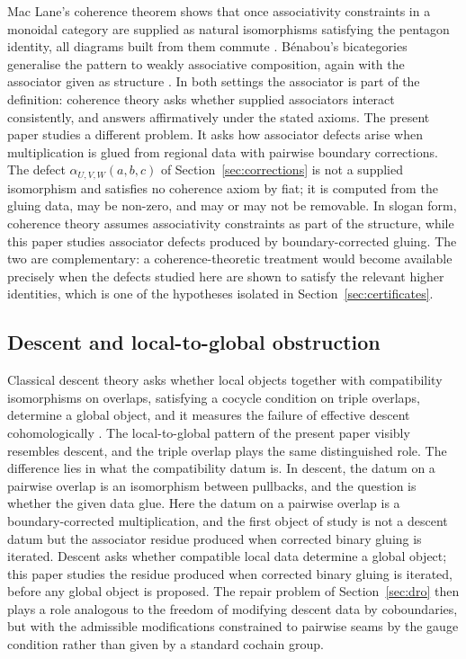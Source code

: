 \documentclass[11pt]{article}
\begin{document}
Mac Lane's coherence theorem shows that once associativity constraints in a monoidal category are supplied as natural isomorphisms satisfying the pentagon identity, all diagrams built from them commute \cite{MacLane1963,MacLane1998}. B\'enabou's bicategories generalise the pattern to weakly associative composition, again with the associator given as structure \cite{Benabou1967}. In both settings the associator is part of the definition: coherence theory asks whether supplied associators interact consistently, and answers affirmatively under the stated axioms. The present paper studies a different problem. It asks how associator defects arise when multiplication is glued from regional data with pairwise boundary corrections. The defect \(\alpha_{U,V,W}(a,b,c)\) of Section~\ref{sec:corrections} is not a supplied isomorphism and satisfies no coherence axiom by fiat; it is computed from the gluing data, may be non-zero, and may or may not be removable. In slogan form, coherence theory assumes associativity constraints as part of the structure, while this paper studies associator defects produced by boundary-corrected gluing. The two are complementary: a coherence-theoretic treatment would become available precisely when the defects studied here are shown to satisfy the relevant higher identities, which is one of the hypotheses isolated in Section~\ref{sec:certificates}.

\subsection{Descent and local-to-global obstruction}

Classical descent theory asks whether local objects together with compatibility isomorphisms on overlaps, satisfying a cocycle condition on triple overlaps, determine a global object, and it measures the failure of effective descent cohomologically \cite{Giraud1971,Vistoli2005,Weibel1994}. The local-to-global pattern of the present paper visibly resembles descent, and the triple overlap plays the same distinguished role. The difference lies in what the compatibility datum is. In descent, the datum on a pairwise overlap is an isomorphism between pullbacks, and the question is whether the given data glue. Here the datum on a pairwise overlap is a boundary-corrected multiplication, and the first object of study is not a descent datum but the associator residue produced when corrected binary gluing is iterated. Descent asks whether compatible local data determine a global object; this paper studies the residue produced when corrected binary gluing is iterated, before any global object is proposed. The repair problem of Section~\ref{sec:dro} then plays a role analogous to the freedom of modifying descent data by coboundaries, but with the admissible modifications constrained to pairwise seams by the gauge condition rather than given by a standard cochain group.
\end{document}
